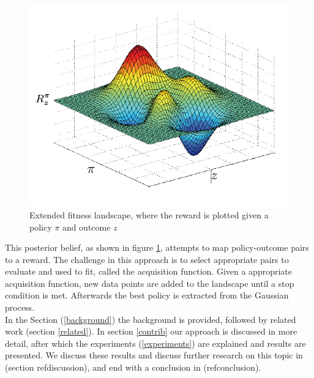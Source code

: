 \begin{figure}[ht]
  \centering
  \includegraphics[scale=0.5]{images/fitness-landscape.png}
  \caption{Extended fitness landscape, where the reward is plotted given a policy $\pi$ and outcome $z$}\label{fitnesslandscape}
\end{figure}

This posterior belief, as shown in figure \ref{fitnesslandscape}, attempts to map policy-outcome pairs to a reward. The challenge in this approach is to select appropriate pairs to evaluate and used to fit, called the acquisition function. Given a appropriate acquisition function, new data points are added to the landscape until a stop condition is met. Afterwards the best policy is extracted from the Gaussian process. \\


In the Section (\ref{background}) the background is provided, followed by related work (section \ref{related}). In section \ref{contrib} our approach is discussed in more detail, after which the experiments (\ref{experiments}) are explained and results are presented. We discuss these results and discuss further research on this topic in (section ref{discussion}), and end with a conclusion in  (ref{conclusion}).


